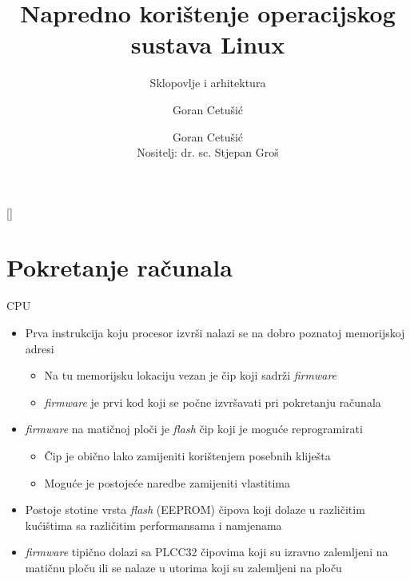 \documentclass[croatian,t]{beamer} %
\title[NKOSL]{Napredno korištenje operacijskog sustava Linux}
\subtitle{Sklopovlje i arhitektura}
\author{Goran Cetušić}
\author[Goran Cetušić]{Goran Cetušić\\{\small Nositelj: dr. sc. Stjepan Groš}}
\institute[FER]{Sveučilište u Zagrebu \\
				Fakultet elektrotehnike i računarstva}
\date{\todayiso}
\begin{document}
    {
    [] %
    \begin{frame}
        \maketitle
    \end{frame}
    }
    
    \begin{frame}
        \tableofcontents
    \end{frame}
    
    \section{Pokretanje računala}
    \begin{frame}{CPU}
    	\begin{itemize}
    		\item Prva instrukcija koju procesor izvrši nalazi se na dobro poznatoj memorijskoj adresi
    		\begin{itemize}
    			\item Na tu memorijsku lokaciju vezan je čip koji sadrži \emph{firmware}
    			\item \emph{firmware} je prvi kod koji se počne izvršavati pri pokretanju računala
    		\end{itemize}
    		\item \emph{firmware} na matičnoj ploči je \emph{flash} čip koji je moguće reprogramirati
    		\begin{itemize}
    			\item Čip je obično lako zamijeniti korištenjem posebnih kliješta
    			\item Moguće je postojeće naredbe zamijeniti vlastitima
    		\end{itemize}
    		\item Postoje stotine vrsta \emph{flash} (EEPROM) čipova koji dolaze u različitim kućištima sa različitim performansama i namjenama
    		\item \emph{firmware} tipično dolazi sa PLCC32 čipovima koji su izravno zalemljeni na matičnu ploču ili se nalaze u utorima koji su zalemljeni na ploču
    	\end{itemize}
    \end{frame}
    
\end{document}

